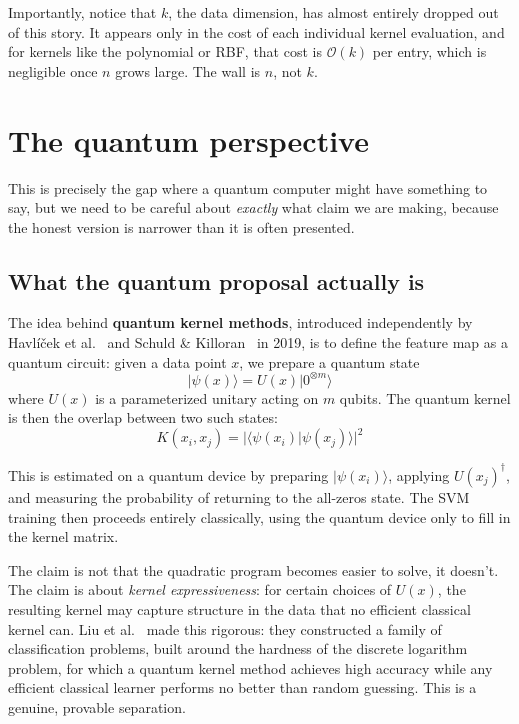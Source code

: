 \documentclass[12pt,a4paper]{article}
\begin{document}
Importantly, notice that $k$, the data dimension, has almost entirely
dropped out of this story. It appears only in the cost of each individual
kernel evaluation, and for kernels like the polynomial or RBF, that cost
is $\mathcal{O}(k)$ per entry, which is negligible once $n$ grows large.
The wall is $n$, not $k$.

\newpage

\section{The quantum perspective}

This is precisely the gap where a quantum computer might have something
to say, but we need to be careful about \emph{exactly} what claim we are
making, because the honest version is narrower than it is often presented.

\subsection{What the quantum proposal actually is}

The idea behind \textbf{quantum kernel methods}, introduced independently
by Havlíček et al.~\cite{Havlicek19} and Schuld \& Killoran~\cite{Schuld19}
in 2019, is to define the feature map as a quantum circuit: given a data
point $x$, we prepare a quantum state
\[
|\psi(x)\rangle = U(x)|0^{\otimes m}\rangle
\]
where $U(x)$ is a parameterized unitary acting on $m$ qubits. The quantum
kernel is then the overlap between two such states:
\[
K(x_i, x_j) = |\langle \psi(x_i) | \psi(x_j) \rangle|^2
\]

This is estimated on a quantum device by preparing $|\psi(x_i)\rangle$,
applying $U(x_j)^\dagger$, and measuring the probability of returning to
the all-zeros state. The SVM training then proceeds entirely classically,
using the quantum device only to fill in the kernel matrix.

The claim is not that the quadratic program becomes easier to solve, 
it doesn't. The claim is about \emph{kernel expressiveness}: for certain
choices of $U(x)$, the resulting kernel may capture structure in the data
that no efficient classical kernel can. Liu et al.~\cite{Liu21} made this
rigorous: they constructed a family of classification problems, built around
the hardness of the discrete logarithm problem, for which a quantum kernel
method achieves high accuracy while any efficient classical learner performs
no better than random guessing. This is a genuine, provable separation.
\end{document}
